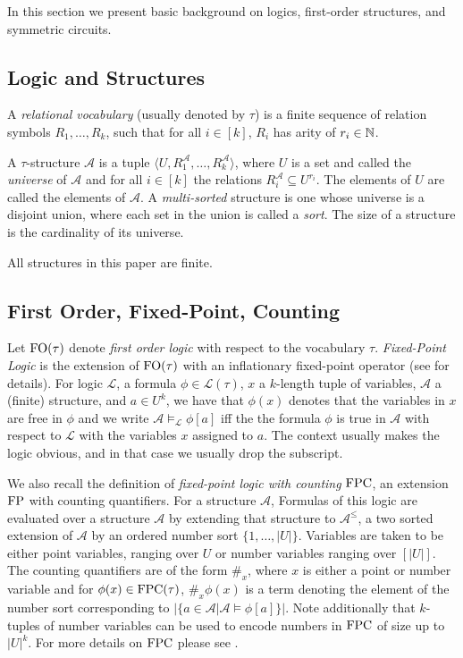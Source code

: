 \documentclass[../paper.tex]{subfiles}
\begin{document}
In this section we present basic background on logics, first-order structures,
and symmetric circuits.

\subsection{Logic and Structures}
A \emph{relational vocabulary} (usually denoted by $\tau$) is a finite sequence
of relation symbols $R_1, \ldots, R_k$, such that for all $i \in [k]$, $R_i$ has
arity of $r_i \in \mathbb{N}$.

A $\tau$-structure $\mathcal{A}$ is a tuple $\langle U, R^{\mathcal{A}}_1 ,
\ldots , R^{\mathcal{A}}_k \rangle$, where $U$ is a set and called the
\emph{universe} of $\mathcal{A}$ and for all $i \in [k]$ the relations
$R^{\mathcal{A}}_i \subseteq U^{r_i}$. The elements of $U$ are called the
elements of $\mathcal{A}$. A \emph{multi-sorted} structure is one whose universe
is a disjoint union, where each set in the union is called a \emph{sort}. The
size of a structure is the cardinality of its universe.

All structures in this paper are finite.

\subsection{First Order, Fixed-Point, Counting}

Let $\text{\upshape FO}(\tau)$ denote \emph{first order logic} with respect to the vocabulary
$\tau$. \emph{Fixed-Point Logic} is the extension of $\text{\upshape FO}(\tau)$ with an
inflationary fixed-point operator (see \cite{} for details). For logic
$\mathcal{L}$, a formula $\phi \in \mathcal{L}(\tau)$, $x$ a $k$-length tuple of
variables, $\mathcal{A}$ a (finite) structure, and $a \in U^k$, we have that
$\phi (x)$ denotes that the variables in $x$ are free in $\phi$ and we write
$\mathcal{A} \models_{\mathcal{L}} \phi[a]$ iff the the formula $\phi$ is true
in $\mathcal{A}$ with respect to $\mathcal{L}$ with the variables $x$ assigned
to $a$. The context usually makes the logic obvious, and in that case we usually
drop the subscript.

We also recall the definition of \emph{fixed-point logic with counting} $\text{\upshape FPC}$,
an extension $\text{\upshape FP}$ with counting quantifiers. For a structure $\mathcal{A}$,
Formulas of this logic are evaluated over a structure $\mathcal{A}$ by extending
that structure to $\mathcal{A}^\leq$, a two sorted extension of $\mathcal{A}$ by
an ordered number sort $\{1, \ldots, \vert U\vert \}$. Variables are taken to be
either point variables, ranging over $U$ or number variables ranging over
$[\vert U \vert]$. The counting quantifiers are of the form $\#_x$, where $x$ is
either a point or number variable and for $\phi(x) \in \text{\upshape FPC}(\tau)$, $\#_x
\phi(x)$ is a term denoting the element of the number sort corresponding to
$\vert \{a \in \mathcal{A} | \mathcal{A} \models \phi[a]\}\vert$. Note
additionally that $k$-tuples of number variables can be used to encode numbers
in $\text{\upshape FPC}$ of size up to $\vert U\vert^k$. For more details on $\text{\upshape FPC}$ please see
\cite{}.
\end{document}
